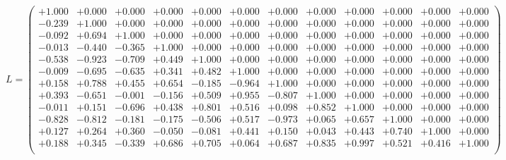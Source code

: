 \documentclass[9pt]{article}
\theoremstyle{plain}
\theoremstyle{definition}
\theoremstyle{remark}
\numberwithin{equation}{section}
\begin{document}
$L = \left(
\begin{array}{
cccccccccccc}
+1.000 & +0.000 & +0.000 & +0.000 & +0.000 & +0.000 & +0.000 & +0.000 & +0.000 & +0.000 & +0.000 & +0.000 \\
-0.239 & +1.000 & +0.000 & +0.000 & +0.000 & +0.000 & +0.000 & +0.000 & +0.000 & +0.000 & +0.000 & +0.000 \\
-0.092 & +0.694 & +1.000 & +0.000 & +0.000 & +0.000 & +0.000 & +0.000 & +0.000 & +0.000 & +0.000 & +0.000 \\
-0.013 & -0.440 & -0.365 & +1.000 & +0.000 & +0.000 & +0.000 & +0.000 & +0.000 & +0.000 & +0.000 & +0.000 \\
-0.538 & -0.923 & -0.709 & +0.449 & +1.000 & +0.000 & +0.000 & +0.000 & +0.000 & +0.000 & +0.000 & +0.000 \\
-0.009 & -0.695 & -0.635 & +0.341 & +0.482 & +1.000 & +0.000 & +0.000 & +0.000 & +0.000 & +0.000 & +0.000 \\
+0.158 & +0.788 & +0.455 & +0.654 & -0.185 & -0.964 & +1.000 & +0.000 & +0.000 & +0.000 & +0.000 & +0.000 \\
+0.393 & -0.651 & -0.001 & -0.156 & +0.509 & +0.955 & -0.807 & +1.000 & +0.000 & +0.000 & +0.000 & +0.000 \\
-0.011 & +0.151 & -0.696 & +0.438 & +0.801 & +0.516 & +0.098 & +0.852 & +1.000 & +0.000 & +0.000 & +0.000 \\
-0.828 & -0.812 & -0.181 & -0.175 & -0.506 & +0.517 & -0.973 & +0.065 & +0.657 & +1.000 & +0.000 & +0.000 \\
+0.127 & +0.264 & +0.360 & -0.050 & -0.081 & +0.441 & +0.150 & +0.043 & +0.443 & +0.740 & +1.000 & +0.000 \\
+0.188 & +0.345 & -0.339 & +0.686 & +0.705 & +0.064 & +0.687 & +0.835 & +0.997 & +0.521 & +0.416 & +1.000 \\
\end{array}
\right)$ \newline 
\end{document}
